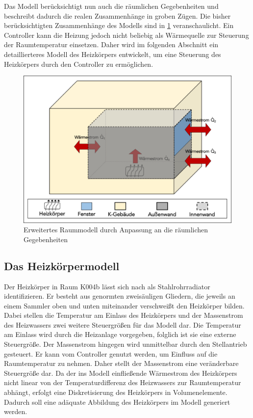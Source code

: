Das Modell berücksichtigt nun auch die räumlichen Gegebenheiten und beschreibt dadurch die realen Zusammenhänge in groben Zügen. Die bisher berücksichtigten Zusammenhänge des Modells sind in \ref{fig:raumeins} veranschaulicht. Ein Controller kann die Heizung jedoch nicht beliebig als Wärmequelle zur Steuerung der Raumtemperatur einsetzen. Daher wird im folgenden Abschnitt ein detaillierteres Modell des Heizkörpers entwickelt, um eine Steuerung des Heizkörpers durch den Controller zu ermöglichen. 

\begin{figure}
\centering
\includegraphics[width=\textwidth]{abbildungen/20160316_raumeins}
\caption{Erweitertes Raummodell durch Anpassung an die räumlichen Gegebenheiten}
\label{fig:raumeins}
\end{figure}



\subsection{Das Heizkörpermodell}

Der Heizkörper in Raum K004b lässt sich nach \cite[S.~824f.]{re14} als Stahlrohrradiator identifizieren. Er besteht aus genormten zweisäuligen Gliedern, die jeweils an einem Sammler oben und unten miteinander verschweißt den Heizkörper bilden. Dabei stellen die Temperatur am Einlass des Heizkörpers und der Massenstrom des Heizwassers zwei weitere Steuergrößen für das Modell dar. Die Temperatur am Einlass wird durch die Heizanlage vorgegeben, folglich ist sie eine externe Steuergröße. Der Massenstrom hingegen wird unmittelbar durch den Stellantrieb gesteuert. Er kann vom Controller genutzt werden, um Einfluss auf die Raumtemperatur zu nehmen. Daher stellt der Massenstrom eine veränderbare Steuergröße dar. Da der ins Modell einfließende Wärmestrom des Heizkörpers nicht linear von der Temperaturdifferenz des Heizwassers zur Raumtemperatur abhängt, erfolgt eine Diskretisierung des Heizkörpers in Volumenelemente. Dadurch soll eine adäquate Abbildung des Heizkörpers im Modell generiert werden. 


